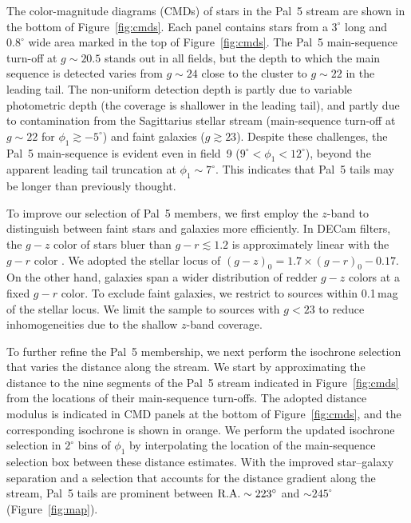 \documentclass[twocolumn]{aastex62}
\begin{document}
The color-magnitude diagrams (CMDs) of stars in the Pal~5 stream are shown in the bottom of Figure~\ref{fig:cmds}.
Each panel contains stars from a $3^\circ$ long and $0.8^\circ$ wide area marked in the top of Figure~\ref{fig:cmds}.
The Pal~5 main-sequence turn-off at $g\sim20.5$ stands out in all fields, but the depth to which the main sequence is detected varies from $g\sim24$ close to the cluster to $g\sim22$ in the leading tail.
The non-uniform detection depth is partly due to variable photometric depth (the coverage is shallower in the leading tail), and partly due to contamination from the Sagittarius stellar stream (main-sequence turn-off at $g\sim22$ for $\phi_1\gtrsim-5^\circ$) and faint galaxies ($g\gtrsim23$).
Despite these challenges, the Pal~5 main-sequence is evident even in field~9 ($9^\circ<\phi_1<12^\circ$), beyond the apparent leading tail truncation at $\phi_1\sim7^\circ$.
This indicates that Pal~5 tails may be longer than previously thought.

To improve our selection of Pal~5 members, we first employ the $z$-band to distinguish between faint stars and galaxies more efficiently.
In DECam filters, the $g-z$ color of stars bluer than $g-r\lesssim1.2$ is approximately linear with the $g-r$ color \citep[e.g.,][]{dey2019}.
We adopted the stellar locus of $(g-z)_0 = 1.7\times(g-r)_0 -0.17$.
On the other hand, galaxies span a wider distribution of redder $g-z$ colors at a fixed $g-r$ color.
To exclude faint galaxies, we restrict to sources within 0.1\,mag of the stellar locus.
We limit the sample to sources with $g<23$ to reduce inhomogeneities due to the shallow $z$-band coverage.

To further refine the Pal~5 membership, we next perform the isochrone selection that varies the distance along the stream.
We start by approximating the distance to the nine segments of the Pal~5 stream indicated in Figure~\ref{fig:cmds} from the locations of their main-sequence turn-offs.
The adopted distance modulus is indicated in CMD panels at the bottom of Figure~\ref{fig:cmds}, and the corresponding isochrone is shown in orange.
We perform the updated isochrone selection in $2^\circ$ bins of $\phi_1$ by interpolating the location of the main-sequence selection box between these distance estimates.
With the improved star--galaxy separation and a selection that accounts for the distance gradient along the stream, Pal~5 tails are prominent between $\rm R.A.\sim223^\circ$ and $\sim245^\circ$ (Figure~\ref{fig:map}).
\end{document}
